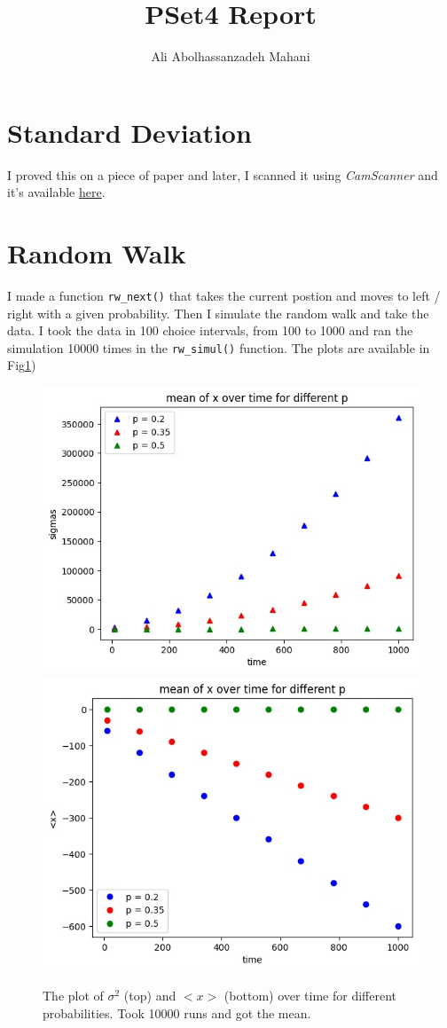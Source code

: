 \documentclass[12pt]{article}
\title{PSet4 Report}
\author{Ali Abolhassanzadeh Mahani}
\begin{document}
	\maketitle
	\section{Standard Deviation}
	I proved this on a piece of paper and later, I scanned it using \emph{CamScanner} and it's available \href{run:d:/../CompPhys4.pdf}{here}.
	\section{Random Walk}
	I made a function \texttt{rw\_next()} that takes the current postion and moves to left / right 
	with a given probability.
	Then I simulate the random walk and take the data. I took the data in 100 choice intervals, from
	100 to 1000 and ran the simulation 10000 times in the \texttt{rw\_simul()} function.
	The plots are available in Fig\ref{fig:rw_sim})
	\begin{figure}[h!]
		\centering
		\includegraphics[width=0.9\linewidth]{../p2/sigmas.jpg}
		\includegraphics[width=0.9\linewidth]{../p2/x_means.jpg}
		\label{fig:rw_sim}
		\caption{The plot of $\sigma^2$ (top) and $<x>$ (bottom) over time for different probabilities. Took 10000 runs and got the mean.}
	\end{figure} 
\end{document}
